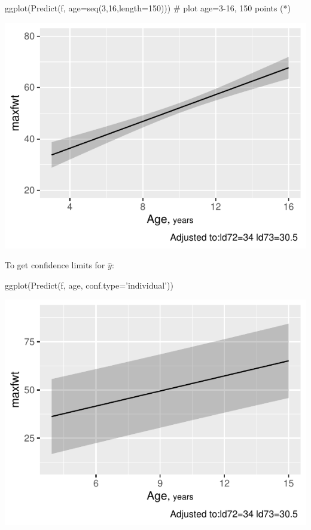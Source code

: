 \begin{Schunk}
\begin{Sinput}
ggplot(Predict(f, age=seq(3,16,length=150)))   # plot age=3-16, 150 points (*\ipacue*)
\end{Sinput}


\centerline{\includegraphics[width=\maxwidth]{rmsintro-unnamed-chunk-11-1} }

\end{Schunk}
\item To get confidence limits for $\hat{y}$: \ipacue
\begin{Schunk}
\begin{Sinput}
ggplot(Predict(f, age, conf.type='individual'))
\end{Sinput}


\centerline{\includegraphics[width=\maxwidth]{rmsintro-unnamed-chunk-12-1} }

\end{Schunk}
